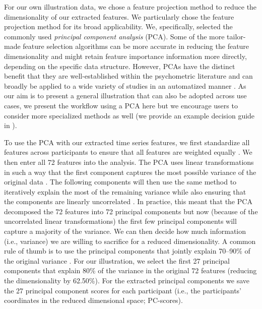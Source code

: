 For our own illustration data, we chose a feature projection method to
reduce the dimensionality of our extracted features. We particularly
chose the feature projection method for its broad applicability. We,
specifically, selected the commonly used
\textit{principal component analysis} (PCA). Some of the more
tailor-made feature selection algorithms can be more accurate in
reducing the feature dimensionality and might retain feature importance
information more directly, depending on the specific data structure.
However, PCAs have the distinct benefit that they are well-established
within the psychometric literature \citep{jolliffe2011} and can broadly
be applied to a wide variety of studies in an automatized manner
\citep{abdi2010}. As our aim is to present a general illustration that
can also be adopted across use cases, we present the workflow using a
PCA here but we encourage users to consider more specialized methods as
well (we provide an example decision guide in \sicontext).

To use the PCA with our extracted time series features, we first
standardize all features across participants to ensure that all features
are weighted equally \citep[][]{horne2020}. We then enter all 72
features into the analysis. The PCA uses linear transformations in such
a way that the first component captures the most possible variance of
the original data
\citep[e.g., by finding a vector that maximizes the sum of squared distances][]{jolliffe2002, abdi2010}.
The following components will then use the same method to iteratively
explain the most of the remaining variance while also ensuring that the
components are linearly uncorrelated \citep{shlens2014}. In practice,
this meant that the PCA decomposed the 72 features into 72 principal
components but now (because of the uncorrelated linear transformations)
the first few principal components will capture a majority of the
variance. We can then decide how much information (i.e., variance) we
are willing to sacrifice for a reduced dimensionality. A common rule of
thumb is to use the principal components that jointly explain 70--90\%
of the original variance
\citep[i.e., cumulative percentage explained variance; e.g.,][]{jackson2003}.
For our illustration, we select the first 27 principal components that
explain 80\% of the variance in the original 72 features (reducing the
dimensionality by 62.50\%). For the extracted principal components we
save the 27 principal component scores for each participant (i.e., the
participants' coordinates in the reduced dimensional space; PC-scores).

